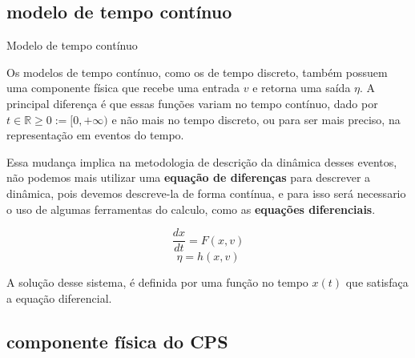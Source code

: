 \documentclass{beamer}
\begin{document}
\subsection{modelo de tempo contínuo}

\begin{frame}{Modelo de tempo contínuo}
	\par Os modelos de tempo contínuo, como os de tempo discreto, também possuem uma componente física que recebe uma entrada $v$ e retorna uma saída $\eta$.
	A principal diferença é que essas funções variam no tempo contínuo, dado por $t \in \mathbb{R} \ge 0 := [0,+\infty)$ e não mais no tempo discreto, ou para ser mais preciso, na representação em eventos do tempo.
	\par Essa mudança implica na metodologia de descrição da dinâmica desses eventos, não podemos mais utilizar uma \textbf{equação de diferenças} para descrever a dinâmica, pois devemos descreve-la de forma contínua, e para isso será necessario o uso de algumas ferramentas do calculo, como as \textbf{equações diferenciais}.
	
	\begin{equation}
		\frac{dx}{dt}=F(x,v)
	\end{equation}
	\begin{equation}
		\eta = h(x,v)
	\end{equation}
	
	\par A solução desse sistema, é definida por uma função no tempo $x(t)$ que satisfaça a equação diferencial.
\end{frame}

\subsection{componente física do CPS}
\end{document}

